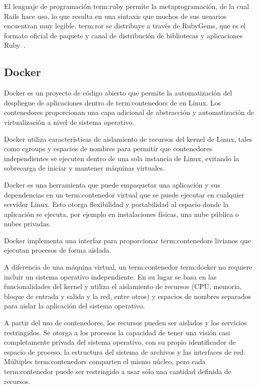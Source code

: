 El lenguaje de programación \gls{term:ruby} permite la metaprogramación, de la
cual Rails hace uso, lo que resulta en una sintaxis que muchos de sus usuarios
encuentran muy legible. \gls{term:ror} se distribuye a través de RubyGems, que
es el formato oficial de paquete y canal de distribución de bibliotecas y
aplicaciones Ruby~\cite{ror}.

\subsection{Docker}
\label{anexo:docker}

Docker es un proyecto de código abierto que permite la automatización del
despliegue de aplicaciones dentro de \glspl{term:contenedor} de 
en Linux. Los contenedores proporcionan una capa adicional de abstracción y
automatización de virtualización a nivel de sistema operativo.

Docker utiliza características de aislamiento de recursos del kernel de Linux,
tales como cgroups y espacios de nombres para permitir que contenedores
independientes se ejecuten dentro de una sola instancia de Linux, evitando la
sobrecarga de iniciar y mantener máquinas virtuales.

Docker es una herramienta que puede empaquetar una aplicación y sus
dependencias en un \gls{term:contenedor} virtual que se puede ejecutar en
cualquier servidor Linux. Esto otorga flexibilidad y portabilidad al espacio
donde la aplicación se ejecuta, por ejemplo en instalaciones físicas,
una nube pública o nubes privadas.

Docker implementa una interfaz para proporcionar \glspl{term:contenedor}
livianos que ejecutan procesos de forma aislada.

A diferencia de una máquina virtual, un \gls{term:contenedor} \gls{term:docker}
no requiere incluir un sistema operativo independiente. En su lugar se basa en
las funcionalidades del kernel y utiliza el aislamiento de recursos (CPU,
memoria, bloque de entrada y salida y la red, entre otros) y espacios de
nombres separados para aislar la aplicación del sistema operativo.

A partir del uso de contenedores, los recursos pueden ser aislados y los
servicios restringidos. Se otorga a los procesos la capacidad de tener una
visión casi completamente privada del sistema operativo, con su propio
identificador de espacio de proceso, la estructura del sistema de archivos y
las interfaces de red. Múltiples \glspl{term:contenedor} comparten el mismo
núcleo, pero cada \gls{term:contenedor} puede ser restringido a usar sólo una
cantidad definida de recursos.

